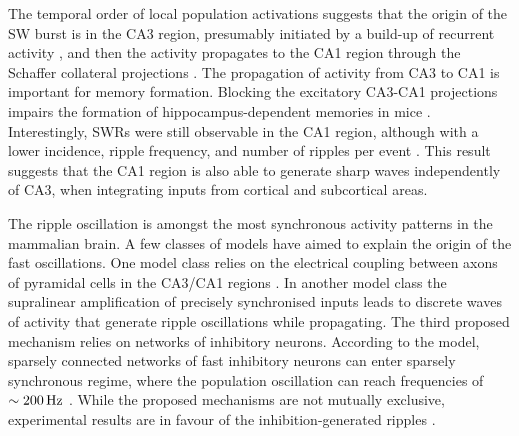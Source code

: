     The temporal order of local population activations suggests that the origin
    of the SW burst is in the CA3 region, presumably initiated by a build-up of
    recurrent activity \citep{delaPrida2006, Ellender2010, Schlingloff2014,
    Hulse2016}, and then the activity propagates to the CA1 region through the
    Schaffer collateral projections \citep{Csicsvari2000}. The propagation of
    activity from CA3 to CA1 is important for memory formation. Blocking the
    excitatory CA3-CA1 projections impairs the formation of
    hippocampus-dependent memories in mice \citep{Nakashiba2008}.
    Interestingly, SWRs were still observable in the CA1 region, although with
    a lower incidence, ripple frequency, and number of ripples per event
    \citep{Nakashiba2009}. This result suggests that the CA1 region is also
    able to generate sharp waves independently of CA3, when integrating inputs
    from cortical and subcortical areas.

    The ripple oscillation is amongst the most synchronous activity patterns in
    the mammalian brain. A few classes of models have aimed to explain the
    origin of the fast oscillations. One model class relies on the electrical
    coupling between axons of pyramidal cells in the CA3/CA1 regions
    \citep{Draguhn1998, Schmitz2001, Traub2012, Vladimirov2013}. In another model
    class the supralinear amplification of precisely synchronised inputs
    \citep{Memmesheimer2010, Jahnke2015} leads to discrete waves of activity
    that generate ripple oscillations while propagating. The third proposed
    mechanism relies on networks of inhibitory neurons. According to the model,
    sparsely connected networks of fast inhibitory neurons can enter sparsely
    synchronous regime, where the population oscillation can reach frequencies
    of $\sim 200\, \rm Hz$ \citep{Brunel2003}. While the proposed mechanisms are
    not mutually exclusive, experimental results are in favour
    of the inhibition-generated ripples \citep{Buhl2005, Schlingloff2014,
    Donoso2017}.

